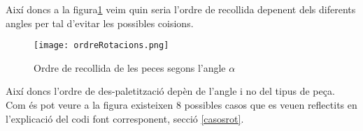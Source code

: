 Així doncs a la figura\ref{figrecpec}
veim quin seria l'ordre de recollida depenent dels diferents angles per tal
d'evitar les possibles co\lgem isions.

\begin{figure}[H]
\begin{center}\label{figrecpec}
 \texttt{[image: ordreRotacions.png]}
\end{center}
  \caption{Ordre de recollida de les peces segons l'angle $\alpha$}
\end{figure}

Així doncs l'ordre de des-paletització depèn de l'angle i no del tipus de peça.
Com és pot veure a la figura existeixen 8 possibles casos que es veuen
reflectits en l'explicació del codi font corresponent, secció \ref{casosrot}.